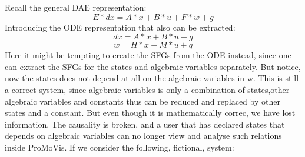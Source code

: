 Recall the general DAE representation:
\begin{equation}
E*dx = A*x + B*u + F*w + g
\end{equation}Introducing the ODE representation that also can be extracted:
\begin{equation}
dx = A*x + B*u + g
\end{equation}
\begin{equation}
w  = H*x + M*u + q
\end{equation}\newline Here it might be tempting to create the SFGs from the ODE instead, since one can extract the SFGs  for the states and algebraic variables separately. But notice, now the states does not depend at all on the algebraic variables in w. This is still a correct system, since algebraic variables is only a combination of states,other algebraic variables and constants thus can be reduced and replaced by other states and a constant. But even though it is mathematically correc, we have lost information. The causality is broken, and a user that has declared states that depends on algebraic variables can no longer view and analyse such relations inside ProMoVis. If we consider the following, fictional, system:

